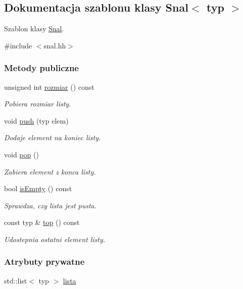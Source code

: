 \hypertarget{class_snal}{\subsection{Dokumentacja szablonu klasy Snal$<$ typ $>$}
\label{class_snal}
}


Szablon klasy \hyperlink{class_snal}{Snal}.  




{\ttfamily \#include $<$snal.\-hh$>$}

\subsubsection*{Metody publiczne}
\begin{DoxyCompactItemize}
\item 
unsigned int \hyperlink{class_snal_a3d863313713b5e2e11ec8a756a86093c}{rozmiar} () const 
\begin{DoxyCompactList}\small\item\em Pobiera rozmiar listy. \end{DoxyCompactList}\item 
void \hyperlink{class_snal_a9c09a2b7b909c0a404782ec749bc47fc}{push} (typ elem)
\begin{DoxyCompactList}\small\item\em Dodaje element na koniec listy. \end{DoxyCompactList}\item 
void \hyperlink{class_snal_aea84c2c7e18e4c384e3e15ec273760eb}{pop} ()
\begin{DoxyCompactList}\small\item\em Zabiera element z konca listy. \end{DoxyCompactList}\item 
bool \hyperlink{class_snal_a17a59deb02eddfb8c7ec324a27a79929}{is\-Empty} () const 
\begin{DoxyCompactList}\small\item\em Sprawdza, czy lista jest pusta. \end{DoxyCompactList}\item 
const typ \& \hyperlink{class_snal_a994360f96b0c2584cba43901ec52d848}{top} () const 
\begin{DoxyCompactList}\small\item\em Udostepnia ostatni element listy. \end{DoxyCompactList}\end{DoxyCompactItemize}
\subsubsection*{Atrybuty prywatne}
\begin{DoxyCompactItemize}
\item 
std\-::list$<$ typ $>$ \hyperlink{class_snal_afa289576c79de5b33bc2964cd20ed653}{lista}
\end{DoxyCompactItemize}


